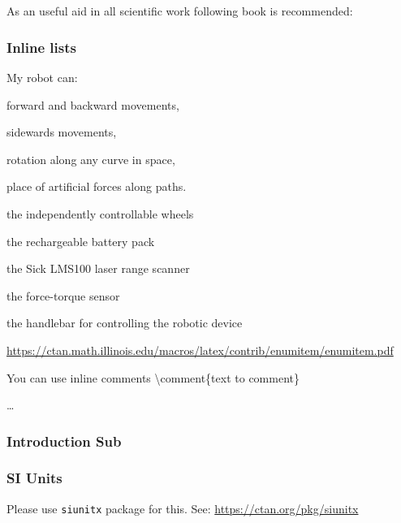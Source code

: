 \chapter{}
\label{sec:Introduction}

As an useful aid in all scientific work following book is recommended: \cite{deininger1992studienarbeiten}


\subsection{Inline lists}
My robot can:
\begin{enumerate*}[label=(\roman*)]
 \item forward and backward movements,
 \item sidewards movements,
 \item rotation along any curve in space,
 \item place of artificial forces along paths.
\end{enumerate*}

\begin{enumerate*}[label=(\arabic*),itemjoin={{; }}]
    \item the independently controllable wheels
    \item the rechargeable battery pack
    \item the Sick LMS100 laser range scanner
    \item the force-torque sensor
    \item the handlebar for controlling the robotic device
\end{enumerate*}

\url{https://ctan.math.illinois.edu/macros/latex/contrib/enumitem/enumitem.pdf}

You can use inline comments \textbackslash comment\{text to comment\}

\dots
{}
\Blindtext

\subsection{Introduction Sub}
\Blindtext
\Blindtext


\subsection{SI Units}
Please use \texttt{siunitx} package for this. See:  \url{https://ctan.org/pkg/siunitx}

